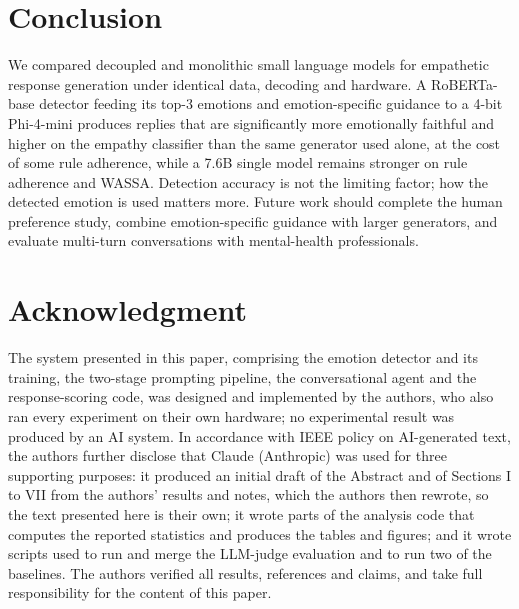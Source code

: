 \documentclass[conference,a4paper]{IEEEtran}
\begin{document}
\section{Conclusion}
We compared decoupled and monolithic small language models for empathetic response generation under identical data, decoding and hardware. A RoBERTa-base detector feeding its top-3 emotions and emotion-specific guidance to a 4-bit Phi-4-mini produces replies that are significantly more emotionally faithful and higher on the empathy classifier than the same generator used alone, at the cost of some rule adherence, while a 7.6B single model remains stronger on rule adherence and WASSA. Detection accuracy is not the limiting factor; how the detected emotion is used matters more. Future work should complete the human preference study, combine emotion-specific guidance with larger generators, and evaluate multi-turn conversations with mental-health professionals.


\section*{Acknowledgment}
The system presented in this paper, comprising the emotion detector and its training, the two-stage prompting pipeline, the conversational agent and the response-scoring code, was designed and implemented by the authors, who also ran every experiment on their own hardware; no experimental result was produced by an AI system. In accordance with IEEE policy on AI-generated text, the authors further disclose that Claude (Anthropic) was used for three supporting purposes: it produced an initial draft of the Abstract and of Sections I to VII from the authors' results and notes, which the authors then rewrote, so the text presented here is their own; it wrote parts of the analysis code that computes the reported statistics and produces the tables and figures; and it wrote scripts used to run and merge the LLM-judge evaluation and to run two of the baselines. The authors verified all results, references and claims, and take full responsibility for the content of this paper.
\end{document}

